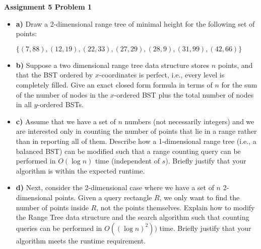 \documentclass[12pt]{article}
\begin{document}
	
	\begin{center}
		{\Large\bf Assignment 5 Problem 1}\\
		\vspace{3mm}
	\end{center}
	
	\def\question#1{\item[\bf #1.]}
	\def\part#1{\item[\bf #1)]}
	\newcommand{\pc}[1]{\mbox{\textbf{#1}}} %
	
	
	
	
	
	\begin{itemize}
		\part{a} Draw a 2-dimensional range tree of minimal height for the following set of points:
		\begin{center}
			$\{(7, 88), (12, 19), (22, 33), (27, 29), (28, 9), (31, 99), (42, 66)\}$ 
		\end{center}
		
		\part{b} Suppose a two dimensional range tree data structure stores $n$ points, and that the BST ordered by $x$-coordinates is perfect, i.e., every level is completely filled.
		Give an exact closed form formula in terms of $n$ for the sum of the number of nodes in the $x$-ordered BST plus the total number of nodes in all $y$-ordered BSTs.
		
		\part{c} Assume that we have a set of $n$ numbers (not necessarily integers) and we are interested only in counting the number of points that lie in a range rather than in reporting all of them.
		Describe how a 1-dimensional range tree (i.e., a balanced BST) can be modified such that a range counting query can be performed in $O(\log n)$ time (independent of $s$).  
		Briefly justify that your algorithm is within the expected runtime.
		
		\part{d} Next, consider the 2-dimensional case where we have a set of $n$ 2-dimensional points.
		Given a query rectangle $R$, we only want to find the number of points inside $R$, not the points themselves.
		Explain how to modify the Range Tree data structure and the search algorithm such that counting queries can be performed in $O((\log n)^2))$ time.  
		Briefly justify that your algorithm meets the runtime requirement.
		
	\end{itemize}
	
	
\end{document}

